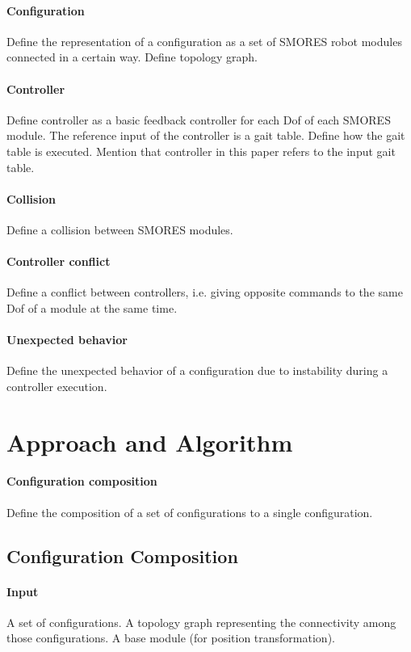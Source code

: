\documentclass[conference]{IEEEtran}
\begin{document}
\paragraph{Configuration}
Define the representation of a configuration as a set of SMORES robot modules connected in a certain way. Define topology graph.


\paragraph{Controller}
Define controller as a basic feedback controller for each Dof of each SMORES module. The reference input of the controller is a gait table. Define how the gait table is executed. Mention that controller in this paper refers to the input gait table.


\paragraph{Collision}
Define a collision between SMORES modules.

\paragraph{Controller conflict}
Define a conflict between controllers, i.e. giving opposite commands to the same Dof of a module at the same time.

\paragraph{Unexpected behavior}
Define the unexpected behavior of a configuration due to instability during a controller execution.

\section{Approach and Algorithm}
\paragraph{Configuration composition}
Define the composition of a set of configurations to a single configuration.

\subsection{Configuration Composition}
\paragraph{Input}
A set of configurations. A topology graph representing the connectivity among those configurations. A base module (for position transformation).
\end{document}
